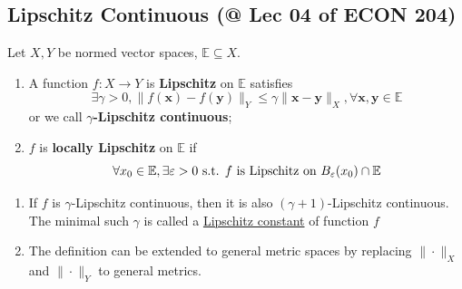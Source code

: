 \documentclass[11pt]{elegantbook}
\begin{document}
\subsection{Lipschitz Continuous \small{(@ Lec 04 of ECON 204)}}
\begin{definition}
    Let $X, Y$ be normed vector spaces, $\mathbb{E} \subseteq X$.
    \begin{enumerate}[(1).]
        \item A function $f: X \rightarrow Y$ is \textbf{Lipschitz} on $\mathbb{E}$ satisfies
        $$\exists \gamma>0, 
        \|f(\mathbf{x})-f(\mathbf{y})\|_Y \leq \gamma\|\mathbf{x}-\mathbf{y}\|_X, \forall \mathbf{x}, \mathbf{y}\in \mathbb{E}
        $$
        or we call \textbf{$\gamma$-Lipschitz continuous};
        \item $f$ is \textbf{locally Lipschitz} on $\mathbb{E}$ if
        $$\forall x_0\in \mathbb{E}, \exists \varepsilon>0 \textnormal{ s.t. $f$ is Lipschitz on }B_\varepsilon(x_0)\cap \mathbb{E}$$
    \end{enumerate}
\end{definition}
\begin{claim}
    \begin{enumerate}[1).]
        \item If $f$ is $\gamma$-Lipschitz continuous, then it is also $(\gamma+1)$-Lipschitz continuous. The minimal such $\gamma$ is called a \underline{Lipschitz constant} of function $f$
        \item The definition can be extended to general metric spaces by replacing $\|\cdot\|_X$ and $\|\cdot\|_Y$ to general metrics.
    \end{enumerate}
\end{claim}
\end{document}
